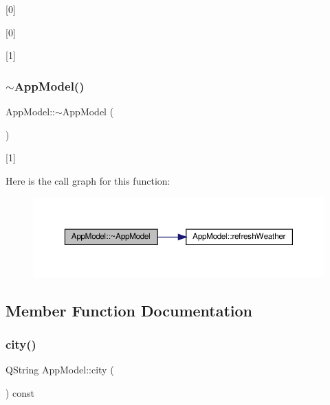 \mbox{[}0\mbox{]} 

\mbox{[}0\mbox{]}

\mbox{[}1\mbox{]} \mbox{\label{class_app_model_a67ab3004ccbe2822a8a0abb9fa96ace3}} 
\subsubsection{\texorpdfstring{$\sim$\+App\+Model()}{~AppModel()}}
{\footnotesize\ttfamily App\+Model\+::$\sim$\+App\+Model (\begin{DoxyParamCaption}{ }\end{DoxyParamCaption})}



\mbox{[}1\mbox{]} 

Here is the call graph for this function\+:
\nopagebreak
\begin{figure}[H]
\begin{center}
\leavevmode
\includegraphics[width=350pt]{class_app_model_a67ab3004ccbe2822a8a0abb9fa96ace3_cgraph}
\end{center}
\end{figure}


\subsection{Member Function Documentation}
\mbox{\label{class_app_model_a093066c81b5fe2c1361df8fd19a21f51}} 
\subsubsection{\texorpdfstring{city()}{city()}}
{\footnotesize\ttfamily Q\+String App\+Model\+::city (\begin{DoxyParamCaption}{ }\end{DoxyParamCaption}) const}

